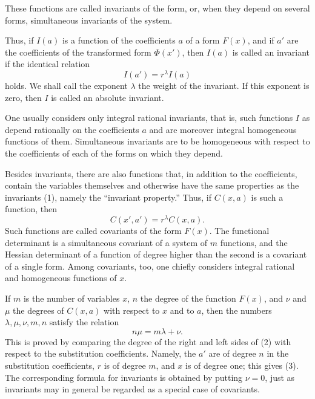\documentclass[11pt]{article}
\begin{document}
These functions are called invariants of the form, or, when they depend on several forms, simultaneous invariants of the system.

Thus, if $I(a)$ is a function of the coefficients $a$ of a form $F(x)$, and if $a'$ are the coefficients of the transformed form $\Phi(x')$, then $I(a)$ is called an invariant if the identical relation
\begin{equation}
 I(a')=r^\lambda I(a)
\tag{1}
\end{equation}
holds. We shall call the exponent $\lambda$ the weight of the invariant. If this exponent is zero, then $I$ is called an absolute invariant.

One usually considers only integral rational invariants, that is, such functions $I$ as depend rationally on the coefficients $a$ and are moreover integral homogeneous functions of them. Simultaneous invariants are to be homogeneous with respect to the coefficients of each of the forms on which they depend.

Besides invariants, there are also functions that, in addition to the coefficients, contain the variables themselves and otherwise have the same properties as the invariants (1), namely the ``invariant property.'' Thus, if $C(x,a)$ is such a function, then
\begin{equation}
 C(x',a')=r^\lambda C(x,a).
\tag{2}
\end{equation}
Such functions are called covariants of the form $F(x)$. The functional determinant is a simultaneous covariant of a system of $m$ functions, and the Hessian determinant of a function of degree higher than the second is a covariant of a single form. Among covariants, too, one chiefly considers integral rational and homogeneous functions of $x$.

If $m$ is the number of variables $x$, $n$ the degree of the function $F(x)$, and $\nu$ and $\mu$ the degrees of $C(x,a)$ with respect to $x$ and to $a$, then the numbers $\lambda,\mu,\nu,m,n$ satisfy the relation
\begin{equation}
 n\mu=m\lambda+\nu.
\tag{3}
\end{equation}
This is proved by comparing the degree of the right and left sides of (2) with respect to the substitution coefficients. Namely, the $a'$ are of degree $n$ in the substitution coefficients, $r$ is of degree $m$, and $x$ is of degree one; this gives (3). The corresponding formula for invariants is obtained by putting $\nu=0$, just as invariants may in general be regarded as a special case of covariants.
\end{document}
